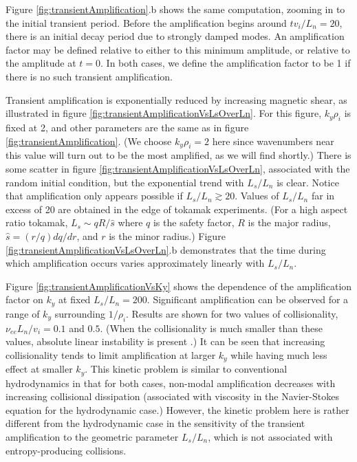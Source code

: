 \documentclass[12pt,superscriptaddress]{revtex4}
\newcommand{\nuee}{\nu_{ee}}
\begin{document}
Figure \ref{fig:transientAmplification}.b shows the same computation, zooming in to the initial transient period.
Before the amplification begins around $t v_i/L_n=20$, there is an initial decay period due to strongly
damped modes. An amplification factor may be defined relative to either to this minimum amplitude,
or relative to the amplitude at $t=0$.
In both cases, we define the amplification factor to be 1
if there is no such transient amplification.


Transient amplification is exponentially reduced by increasing magnetic shear,
as illustrated in figure \ref{fig:transientAmplificationVsLsOverLn}.
For this figure, $k_y \rho_i$ is fixed at 2, and other parameters
are the same as in figure \ref{fig:transientAmplification}.
(We choose $k_y \rho_i=2$ here since
wavenumbers near this value will turn out to be the most
amplified, as we will find shortly.)
There is some scatter in figure \ref{fig:transientAmplificationVsLsOverLn}, associated with the random initial condition,
but the exponential trend with $L_s/L_n$ is clear.
Notice that amplification only appears possible if $L_s/L_n \gtrsim 20$.
Values of $L_s/L_n$ far in excess of 20 are obtained in the edge of tokamak experiments.
(For a high aspect ratio tokamak, $L_s \sim qR/\hat{s}$ where $q$ is the safety factor, $R$ is
the major radius, $\hat{s} = (r/q) dq/dr$, and $r$ is the minor radius.)
Figure \ref{fig:transientAmplificationVsLsOverLn}.b demonstrates that the time during which amplification occurs
varies approximately linearly with $L_s/L_n$.

Figure \ref{fig:transientAmplificationVsKy} shows the dependence
of the amplification factor on $k_y$ at fixed $L_s/L_n = 200$.
Significant amplification can be observed for a range of $k_y$ surrounding
$1/\rho_i$.
Results are shown for two values of collisionality,
$\nuee L_n / v_i = 0.1$ and $0.5$.
(When the collisionality is much smaller than these values,
absolute linear instability is present \cite{usUniversalInstability}.)
It can be seen that increasing collisionality tends to limit amplification
at larger $k_y$ while having much less effect at smaller $k_y$.
This kinetic problem is similar to conventional hydrodynamics in that for both cases, non-modal amplification
decreases with increasing collisional dissipation (associated with viscosity in the Navier-Stokes equation
for the hydrodynamic case.)
However, the kinetic problem here is rather different
from the hydrodynamic case in the sensitivity of the transient amplification
to the geometric parameter $L_s/L_n$,
which is not associated with entropy-producing collisions.
\end{document}
